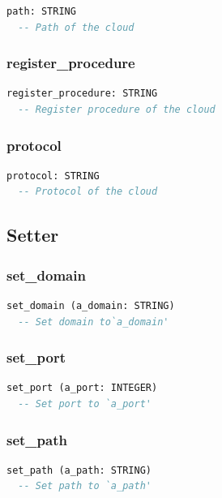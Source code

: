 \begin{lstlisting}[language=Eiffel]
path: STRING
  -- Path of the cloud
\end{lstlisting}

\subsubsection{register\_procedure}

\begin{lstlisting}[language=Eiffel]
register_procedure: STRING
  -- Register procedure of the cloud
\end{lstlisting}

\subsubsection{protocol}

\begin{lstlisting}[language=Eiffel]
protocol: STRING
  -- Protocol of the cloud
\end{lstlisting}

\subsection{Setter}
\label{sec:channel-cloud-setter}

\subsubsection{set\_domain}

\begin{lstlisting}[language=Eiffel]
set_domain (a_domain: STRING)
  -- Set domain to`a_domain'
\end{lstlisting}

\subsubsection{set\_port}

\begin{lstlisting}[language=Eiffel]
set_port (a_port: INTEGER)
  -- Set port to `a_port'
\end{lstlisting}

\subsubsection{set\_path}

\begin{lstlisting}[language=Eiffel]
set_path (a_path: STRING)
  -- Set path to `a_path'
\end{lstlisting}

